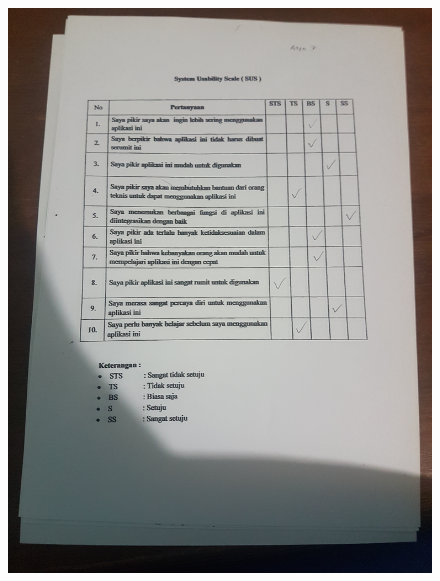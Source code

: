 \begin{figure}[H]
	\center
	\includegraphics [width = 17cm,angle=-90]{gambar/pengujian/agen7}
\end{figure}
